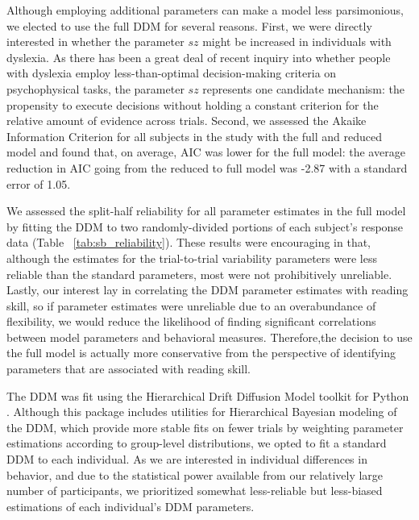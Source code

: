 \documentclass[../uwthesis.tex]{subfiles}
\begin{document}
Although employing additional parameters can make a model less parsimonious, we elected to use the full DDM for several reasons. First, we were directly interested in whether the
parameter $sz$ might be increased in individuals with dyslexia. As there has been a great deal of recent inquiry into whether people with dyslexia employ less-than-optimal decision-making
criteria on psychophysical tasks, the parameter $sz$ represents one candidate mechanism: the propensity to execute decisions without holding a constant criterion for the relative amount of
evidence across trials. Second, we assessed the Akaike Information Criterion for all subjects in the study with the full and reduced model and found that, on average, AIC was lower for the full model: the average reduction in AIC going from the reduced to full model was -2.87 with a standard error of 1.05.

We assessed the split-half reliability for all parameter estimates in the full model by fitting the DDM to two randomly-divided portions of each subject’s response data (Table ~\ref{tab:sb_reliability}). These results were encouraging in that, although the estimates for the trial-to-trial variability parameters
were less reliable than the standard parameters, most were not prohibitively unreliable. Lastly, our interest lay in correlating the DDM parameter estimates with reading skill, so if parameter
estimates were unreliable due to an overabundance of flexibility, we would reduce the likelihood of finding significant correlations between model parameters and behavioral measures. Therefore,the decision to use the full model is actually more conservative from the perspective of identifying
parameters that are associated with reading skill.

The DDM was fit using the Hierarchical Drift Diffusion Model toolkit for Python \citep{Wiecki2013HDDM:Python}.
Although this package includes utilities for Hierarchical Bayesian modeling of the DDM, which provide more stable fits on fewer trials by weighting parameter estimations according to group-level distributions, we opted to fit a standard DDM to each individual. As we are interested in individual differences in behavior, and due to the statistical power available from our relatively large number of participants, we prioritized somewhat less-reliable but less-biased estimations of
each individual’s DDM parameters.
\end{document}
